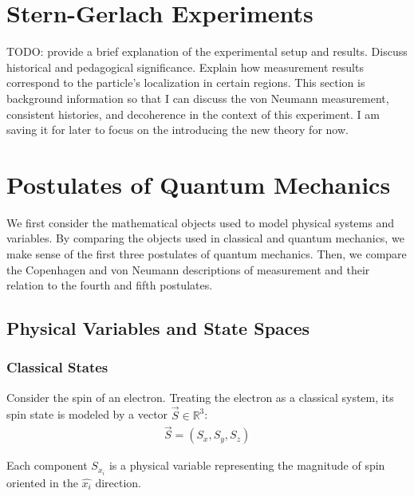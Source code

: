\usetikzlibrary{shapes.geometric}
\usetikzlibrary{positioning}

\newcommand{\apparatus}[4]{\node[square node] (#1) at (#2,#3){#4};
                           \node[port] (#1+) at (#2 + 0.375, #3 + 0.5){+};
                           \node[port] (#1-) at (#2 + 0.375, #3 - 0.5){-};}

\chapter{Stern-Gerlach Experiments}

TODO: provide a brief explanation of the experimental setup and results. Discuss historical and pedagogical significance. Explain how measurement results correspond to the particle's localization in certain regions. This section is background information so that I can discuss the von Neumann measurement, consistent histories, and decoherence in the context of this experiment. I am saving it for later to focus on the introducing the new theory for now.

\chapter{Postulates of Quantum Mechanics}

We first consider the mathematical objects used to model physical systems and variables. By comparing the objects used in classical and quantum mechanics, we make sense of the first three postulates of quantum mechanics. Then, we compare the Copenhagen and von Neumann descriptions of measurement and their relation to the fourth and fifth postulates.

\section{Physical Variables and State Spaces}
\subsection{Classical States}
Consider the spin of an electron. Treating the electron as a classical system, its spin state is modeled by a vector $\vec{S} \in \mathbb{R}^3$:
\begin{align}
\vec{S} = (S_x, S_y, S_z)
\end{align}

Each component $S_{x_i}$ is a physical variable representing the magnitude of spin oriented in the $\hat{x_i}$ direction.

